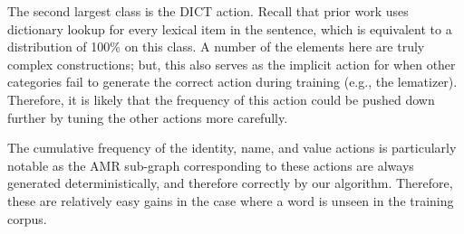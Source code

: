 \documentclass[11pt]{article}
\newcommand\w[1]{\textit{#1}} %
\begin{document}
The second largest class is the DICT action.
Recall that prior work uses dictionary lookup for every lexical item in the
  sentence, which is equivalent to a distribution of 100\% on this class.
A number of the elements here are truly complex constructions; but, this also
  serves as the implicit action for when other categories fail to generate the
  correct action during training (e.g., the lematizer).
Therefore, it is likely that the frequency of this action could be pushed down
  further by tuning the other actions more carefully.

The cumulative frequency of the identity, name, and value actions is particularly 
  notable as the AMR sub-graph corresponding to these actions are
  always generated deterministically, and therefore correctly by our algorithm.
Therefore, these are relatively easy gains in the case where a word is unseen in the
  training corpus.







%
%
\end{document}
